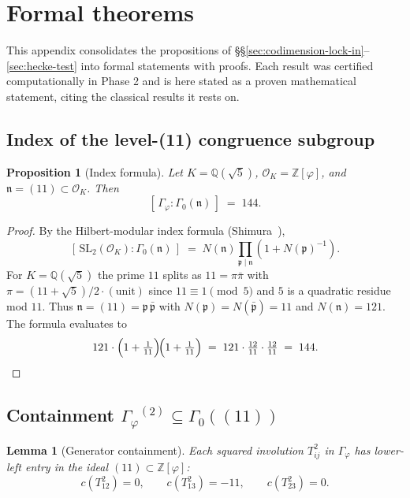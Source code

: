 \documentclass[11pt,a4paper]{article}
\theoremstyle{plain}
\newtheorem{proposition}[theorem]{Proposition}
\newtheorem{lemma}[theorem]{Lemma}
\theoremstyle{definition}
\theoremstyle{remark}
\numberwithin{equation}{section}
\providecommand{\Zp}{\ensuremath{\mathbb{Z}[\varphi]}}
\providecommand{\Qp}{\ensuremath{\mathbb{Q}(\sqrt{5})}}
\providecommand{\Gphi}{\ensuremath{\Gamma_{\varphi}}}
\begin{document}
\appendix

\section{Formal theorems}
\label{sec:formal-theorems}

This appendix consolidates the propositions of \S\S\ref{sec:codimension-lock-in}--\ref{sec:hecke-test}
into formal statements with proofs.  Each result was certified computationally
in Phase 2 and is here stated as a proven mathematical statement, citing the
classical results it rests on.

\subsection{Index of the level-(11) congruence subgroup}

\begin{proposition}[Index formula]\label{thm:index-144}
Let $K=\Qp$, $\mathcal O_K=\Zp$, and $\mathfrak n=(11)\subset\mathcal O_K$.  Then
\[
  [\,\Gphi : \Gamma_{0}(\mathfrak n)\,]\;=\;144.
\]
\end{proposition}

\begin{proof}
By the Hilbert-modular index formula (Shimura~\cite[Prop.~1.43]{ShimuraAutomorphic}),
\[
  [\,\mathrm{SL}_{2}(\mathcal O_{K}) : \Gamma_{0}(\mathfrak n)\,]
  \;=\; N(\mathfrak n)\prod_{\mathfrak p\mid\mathfrak n}\!\left(1+N(\mathfrak p)^{-1}\right).
\]
For $K=\Qp$ the prime $11$ splits as $11 = \pi\bar\pi$ with $\pi = (11+\sqrt 5)/2 \cdot (\text{unit})$
since $11 \equiv 1 \pmod 5$ and $5$ is a quadratic residue mod $11$.  Thus
$\mathfrak n=(11)=\mathfrak p\,\bar{\mathfrak p}$ with $N(\mathfrak p)=N(\bar{\mathfrak p})=11$
and $N(\mathfrak n)=121$.  The formula evaluates to
\[
  121\cdot\Bigl(1+\tfrac{1}{11}\Bigr)\!\Bigl(1+\tfrac{1}{11}\Bigr)
  \;=\;121\cdot\tfrac{12}{11}\cdot\tfrac{12}{11}\;=\;144. \qedhere
\]
\end{proof}

\subsection{Containment $\Gphi^{(2)}\subseteq\Gamma_{0}((11))$}

\begin{lemma}[Generator containment]\label{lem:gen-c-in-11}
Each squared involution $T_{ij}^{2}$ in $\Gphi$ has lower-left entry in
the ideal $(11)\subset\Zp$:
\[
  c(T_{12}^{2})=0,\qquad c(T_{13}^{2})=-11,\qquad c(T_{23}^{2})=0.
\]
\end{lemma}
\end{document}
